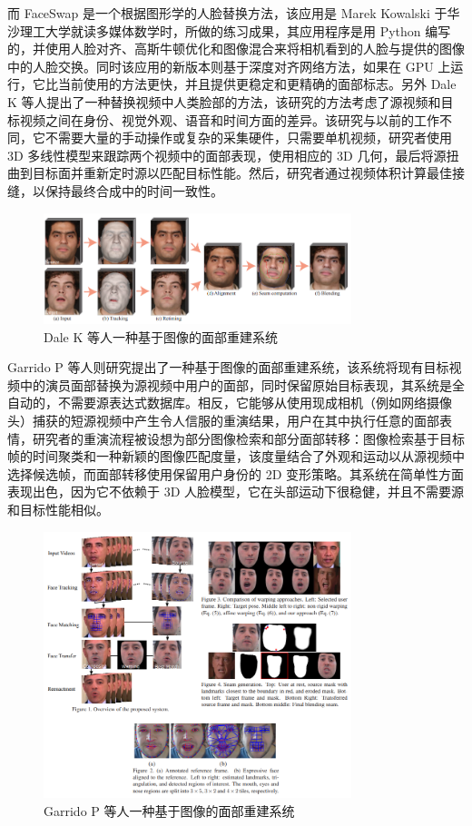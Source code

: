 而 FaceSwap \cite{list1107} 是一个根据图形学的人脸替换方法，该应用是 Marek Kowalski 于华沙理工大学就读多媒体数学时，所做的练习成果，其应用程序是用 Python 编写的，并使用人脸对齐、高斯牛顿优化和图像混合来将相机看到的人脸与提供的图像中的人脸交换。同时该应用的新版本则基于深度对齐网络方法，如果在 GPU 上运行，它比当前使用的方法更快，并且提供更稳定和更精确的面部标志。另外 Dale K 等人\cite{dale2011video}提出了一种替换视频中人类脸部的方法，该研究的方法考虑了源视频和目标视频之间在身份、视觉外观、语音和时间方面的差异。该研究与以前的工作不同，它不需要大量的手动操作或复杂的采集硬件，只需要单机视频，研究者使用 3D 多线性模型来跟踪两个视频中的面部表现，使用相应的 3D 几何，最后将源扭曲到目标面并重新定时源以匹配目标性能。然后，研究者通过视频体积计算最佳接缝，以保持最终合成中的时间一致性。

\begin{figure}[htb]
\centering 
\includegraphics[width=0.80\textwidth]{img/ch1m3.png} 
\caption{Dale K 等人一种基于图像的面部重建系统}
\label{Test}
\end{figure}

Garrido P \cite{garrido2014automatic} 等人则研究提出了一种基于图像的面部重建系统，该系统将现有目标视频中的演员面部替换为源视频中用户的面部，同时保留原始目标表现，其系统是全自动的，不需要源表达式数据库。相反，它能够从使用现成相机（例如网络摄像头）捕获的短源视频中产生令人信服的重演结果，用户在其中执行任意的面部表情，研究者的重演流程被设想为部分图像检索和部分面部转移：图像检索基于目标帧的时间聚类和一种新颖的图像匹配度量，该度量结合了外观和运动以从源视频中选择候选帧，而面部转移使用保留用户身份的 2D 变形策略。其系统在简单性方面表现出色，因为它不依赖于 3D 人脸模型，它在头部运动下很稳健，并且不需要源和目标性能相似。

\begin{figure}[htb]
\centering 
\includegraphics[width=0.80\textwidth]{img/ch1m4.png} 
\caption{Garrido P 等人一种基于图像的面部重建系统}
\label{Test}
\end{figure}

